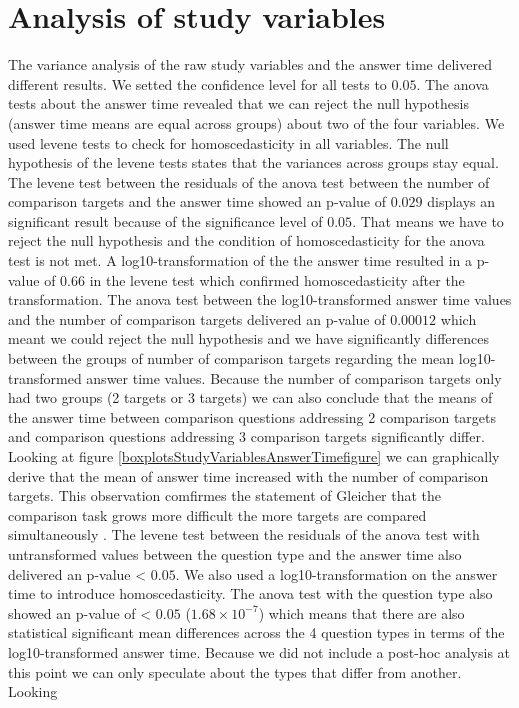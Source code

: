 \section{Analysis of study variables}
The variance analysis of the raw study variables and the answer time delivered different results. We setted the confidence level for all tests to $0.05$. The anova tests
about the answer time revealed that we can reject the null hypothesis (answer time means are equal across groups) about two of the four variables.
We used levene tests to check for homoscedasticity in all variables. The null hypothesis of the levene tests states that the variances across groups stay equal.
The levene test between the residuals of the anova test between the number of comparison targets and the answer time showed an p-value of $0.029$ displays an significant result
because of the significance level of $0.05$. That means we have to reject the null hypothesis and the condition of homoscedasticity for the anova test is not met.
A log10-transformation of the the answer time resulted in a p-value of $0.66$ in the levene test which confirmed homoscedasticity after the transformation.
The anova test between the log10-transformed answer time values and the number of comparison targets delivered an p-value of $0.00012$ which meant we could reject the
null hypothesis and we have significantly differences between the groups of number of comparison targets regarding the mean log10-transformed answer time values.
Because the number of comparison targets only had two groups (2 targets or 3 targets) we can also conclude that the means of the answer time between comparison
questions addressing 2 comparison targets and comparison questions addressing 3 comparison targets significantly differ. Looking at figure \ref{boxplotsStudyVariablesAnswerTimefigure}
we can graphically derive that the mean of answer time increased with the number of comparison targets. This observation comfirmes the statement of Gleicher that
the comparison task grows more difficult the more targets are compared simultaneously \citep*{Gleicher.2018}. 
The levene test between the residuals of the anova test with untransformed values between the question type and the answer time also delivered an p-value < $0.05$.
We also used a log10-transformation on the answer time to introduce homoscedasticity. The anova test with the question type also showed an p-value of
< $0.05$ ($1.68 \times 10^{-7}$) which means that there are also statistical significant mean differences across the 4 question types in terms of the
log10-transformed answer time. Because we did not include a post-hoc analysis at this point we can only speculate about the types that differ from another. Looking
